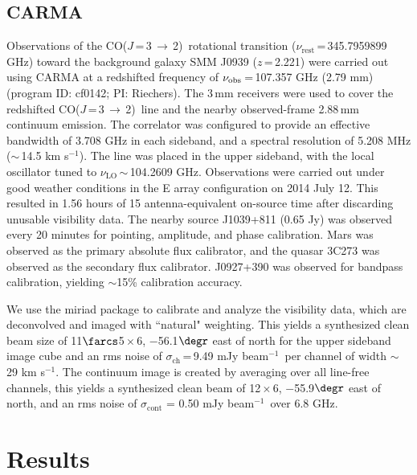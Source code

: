 \documentclass[iop]{emulateapj}
\newcommand{\CO}{\mbox{CO($J$\,=\,3\,$\rightarrow$\,2) }}
\newcommand{\pmOne}{\mbox{$^{-1}$}}
\begin{document}
\subsection{CARMA} \label{sec:carmadata}
Observations of the \CO rotational transition ($\nu_\textrm{rest}$\,=\,345.7959899 GHz) toward the background galaxy SMM
J0939 ($z$\,=\,2.221) were carried out using CARMA at a redshifted frequency of $\nu_{\rm obs}$\,=\,107.357\,\,GHz (2.79\,\,mm)  (program ID: cf0142; PI: Riechers). The 3\,mm receivers were used to cover the redshifted \CO line and the nearby observed-frame 2.88\,mm continuum emission. The correlator was configured to provide an effective bandwidth of 3.708 GHz in each sideband, and a spectral resolution of 5.208 MHz ($\sim$\,14.5 km\,\,s\pmOne). 
The line was placed in the
upper sideband, with the local oscillator tuned to $\nu_\textrm{LO}$\,$\sim$\,104.2609 GHz. %
Observations were carried out under good
weather conditions in the E array configuration on 2014 July 12. This resulted in 1.56 hours of 15 antenna-equivalent on-source time after discarding unusable visibility data.
The nearby source J1039+811 (0.65\,\,Jy) was observed every 20 minutes for
pointing, amplitude, and phase calibration. Mars was observed as the primary
absolute flux calibrator, and the quasar 3C273 was observed as the secondary
flux calibrator. J0927+390 was observed for bandpass calibration, yielding $\sim
$15\% calibration accuracy. \par
We use the {\sc miriad} package to calibrate and analyze the visibility data, which are deconvolved and imaged with ``natural" weighting.
This yields a synthesized clean beam size of 11$\farcs$5\,$\times$\,6, $-$56.1$\degr$ east of north for the upper sideband image cube and an rms noise of $\sigma_\textrm{ch}$\,=\,9.49\,\,mJy\,\,beam\pmOne\ per channel
of width $\sim$\,29 km\,\,s\pmOne.
The continuum image is created by
averaging over all line-free channels, this yields a synthesized clean beam of 12\,$\times$\,6, $-$55.9$\degr$ east of north, and an rms noise of $\sigma_\textrm{cont}$ = 0.50\,\,mJy\,\,beam\pmOne\ over 6.8 GHz.
\section{Results}\label{sec:res}
\end{document}
